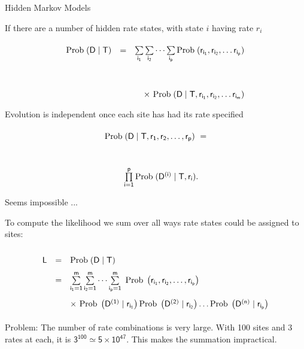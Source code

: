 \documentclass[bluish,slideColor,colorBG,pdf]{prosper}
\def\Prob{{\rm Prob\;}}
\begin{document}
\begin{slide}[Replace]{Hidden Markov Models}
\bigskip

If there are a number of hidden rate states, with state $i$ having rate $r_i$
\[
\begin{array}{c c r}
\mathsf{\Prob(D\;|\;T)} & \mathsf{=} & \mathsf{\sum\limits_{i_1} \sum\limits_{i_2} \dots \sum\limits_{i_p} \Prob (r_{i_1}, r_{i_2}, \dots r_{i_p})}\\
\\
& & \mathsf{\times \ \Prob(D\;|\;T, r_{i_1}, r_{i_2}, \dots r_{i_m})}
\end{array}
\]
Evolution is independent once each site has had its rate specified
\[
\begin{array}{l}
\mathsf{\Prob(D\; |\; T, r_1, r_2, \dots, r_p)\ = }\\
\\
\mathsf{~~~~~~~\prod\limits_{i=1}^p \Prob(D^{(i)}\; |\; T, r_i)}.
\end{array}
\]

\end{slide}

\begin{slide}[Replace]{Seems impossible ...}
\bigskip

To compute the likelihood we sum over all ways rate states could be
assigned to sites:

\[
\renewcommand{\arraystretch}{2.0}
\begin{array}{c c l}
\mathsf{L} & \mathsf{=}  & \mathsf{\Prob(D\;|\;T)}\\
&  \mathsf{=} & \mathsf{\sum\limits_{i_1=1}^m \sum\limits_{i_2=1}^m \dots \sum\limits_{i_p=1}^m\ \Prob\left(r_{i_1}, r_{i_2}, \dots, r_{i_p}\right)} \\
& &\mathsf{\times\ \Prob\left(D^{(1)}\;|\;r_{i_1}\right) \Prob\left(D^{(2)}\;|\;r_{i_2}\right) \dots \Prob\left(D^{(n)}\;|\;r_{i_p}\right)}
\end{array}
\]
\bigskip

Problem: The number of rate combinations is very large.  With
100 sites and 3 rates at each, it is $\mathsf{3^{100} \simeq 5 \times 10^{47}}$.
This makes the summation impractical.

\end{slide}
\end{document}
